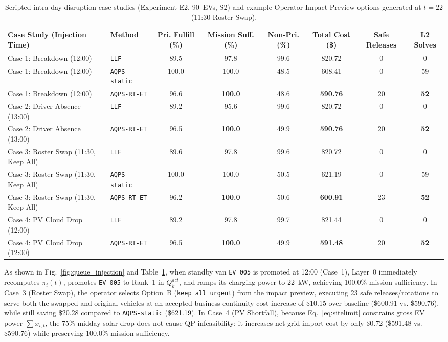\documentclass[final,3p,times,twocolumn]{elsarticle}
\begin{document}
\begin{table}[htbp]
\centering
\caption{Scripted intra-day disruption case studies (Experiment E2, 90~EVs, S2) and example Operator Impact Preview options generated at $t=22$ (11:30 Roster Swap).}
\label{tab:case_studies}
\footnotesize
\begin{tabular}{llcccccc}
\toprule
Case Study (Injection Time) & Method & Pri. Fulfill (\%) & Mission Suff. (\%) & Non-Pri. (\%) & Total Cost (\$) & Safe Releases & L2 Solves \\
\midrule
Case 1: Breakdown (12:00) & \texttt{LLF} & 89.5 & 97.8 & 99.6 & 820.72 & 0 & 0 \\
Case 1: Breakdown (12:00) & \texttt{AQPS-static} & 100.0 & 100.0 & 48.5 & 608.41 & 0 & 59 \\
Case 1: Breakdown (12:00) & \texttt{AQPS-RT-ET} & 96.6 & \textbf{100.0} & 48.6 & \textbf{590.76} & 20 & \textbf{52} \\
\midrule
Case 2: Driver Absence (13:00) & \texttt{LLF} & 89.2 & 95.6 & 99.6 & 820.72 & 0 & 0 \\
Case 2: Driver Absence (13:00) & \texttt{AQPS-RT-ET} & 96.5 & \textbf{100.0} & 49.9 & \textbf{590.76} & 20 & \textbf{52} \\
\midrule
Case 3: Roster Swap (11:30, Keep All) & \texttt{LLF} & 89.6 & 97.8 & 99.6 & 820.72 & 0 & 0 \\
Case 3: Roster Swap (11:30, Keep All) & \texttt{AQPS-static} & 100.0 & 100.0 & 50.5 & 621.19 & 0 & 59 \\
Case 3: Roster Swap (11:30, Keep All) & \texttt{AQPS-RT-ET} & 96.2 & \textbf{100.0} & 50.6 & \textbf{600.91} & 23 & \textbf{52} \\
\midrule
Case 4: PV Cloud Drop (12:00) & \texttt{LLF} & 89.2 & 97.8 & 99.7 & 821.44 & 0 & 0 \\
Case 4: PV Cloud Drop (12:00) & \texttt{AQPS-RT-ET} & 96.5 & \textbf{100.0} & 49.9 & \textbf{591.48} & 20 & \textbf{52} \\
\bottomrule
\end{tabular}
\end{table}

As shown in Fig.~\ref{fig:queue_injection} and Table~\ref{tab:case_studies}, when standby van \texttt{EV\_005} is promoted at 12:00 (Case~1), Layer~0 immediately recomputes $\pi_i(t)$, promotes \texttt{EV\_005} to Rank~1 in $Q_k^{act}$, and ramps its charging power to 22~kW, achieving 100.0\% mission sufficiency. In Case~3 (Roster Swap), the operator selects Option~B (\texttt{keep\_all\_urgent}) from the impact preview, executing 23 safe releases/rotations to serve both the swapped and original vehicles at an accepted business-continuity cost increase of \$10.15 over baseline (\$600.91 vs. \$590.76), while still saving \$20.28 compared to \texttt{AQPS-static} (\$621.19). In Case~4 (PV Shortfall), because Eq.~\eqref{eq:sitelimit} constrains gross EV power $\sum x_{i,t}$, the 75\% midday solar drop does not cause QP infeasibility; it increases net grid import cost by only \$0.72 (\$591.48 vs. \$590.76) while preserving 100.0\% mission sufficiency.
\end{document}

